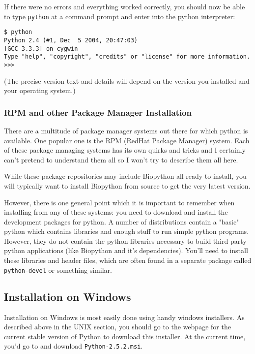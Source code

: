 \documentclass{article}
\begin{document}
If there were no errors and everything worked correctly, you should now
be able to type \verb|python| at a command prompt and enter into the
python interpreter:

\begin{verbatim}
$ python
Python 2.4 (#1, Dec  5 2004, 20:47:03)
[GCC 3.3.3] on cygwin
Type "help", "copyright", "credits" or "license" for more information.
>>>
\end{verbatim}

\noindent (The precise version text and details will depend on the version you installed and your operating system.)

\subsubsection{RPM and other Package Manager Installation}

There are a multitude of package manager systems out there for which
python is available. One popular one is the RPM (RedHat Package Manager)
system. Each of these package managing systems has its own quirks and
tricks and I certainly can't pretend to understand them all so I won't
try to describe them all here.

While these package repositories may include Biopython all ready to install,
you will typically want to install Biopython from source to get the very
latest version.

However, there is one general point which it is important to remember
when installing from any of these systems: you need to download and
install the development packages for python. A number of distributions
contain a "basic" python which contains libraries and enough stuff to
run simple python programs. However, they do not contain the python
libraries necessary to build third-party python applications (like
Biopython and it's dependencies). You'll need to install these libraries
and header files, which are often found in a separate package called
\verb|python-devel| or something similar. 

\subsection{Installation on Windows} 

Installation on Windows is most easily done using handy windows
installers. As described above in the UNIX section, you should go to the
webpage for the current stable version of Python to download this
installer. At the current time, you'd go to
 and download
\verb|Python-2.5.2.msi|. 
\end{document}
